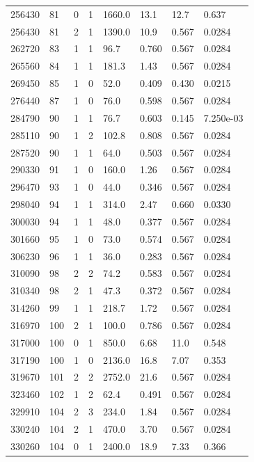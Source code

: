\documentclass[preview]{standalone}
\begin{document}
{{{\begin{tabular}{L{1.2cm}C{1.2cm} C{0.3cm}C{0.5cm} C{1.4cm}C{1.4cm} C{1.4cm}C{1.4cm}}
  256430  &    81  & 0     &  1 &  1660.0  & 13.1  & 12.7 &  0.637   \\ 
  256430  &    81  & 2     &  1 &  1390.0  & 10.9  & 0.567 &  0.0284   \\ 
  262720  &    83  & 1     &  1 &  96.7  & 0.760  & 0.567 &  0.0284   \\ 
  265560  &    84  & 1     &  1 &  181.3  & 1.43  & 0.567 &  0.0284   \\ 
  269450  &    85  & 1     &  0 &  52.0  & 0.409  & 0.430 &  0.0215   \\ 
  276440  &    87  & 1     &  0 &  76.0  & 0.598  & 0.567 &  0.0284   \\ 
  284790  &    90  & 1     &  1 &  76.7  & 0.603  & 0.145 &  7.250e-03   \\ 
  285110  &    90  & 1     &  2 &  102.8  & 0.808  & 0.567 &  0.0284   \\ 
  287520  &    90  & 1     &  1 &  64.0  & 0.503  & 0.567 &  0.0284   \\ 
  290330  &    91  & 1     &  0 &  160.0  & 1.26  & 0.567 &  0.0284   \\ 
  296470  &    93  & 1     &  0 &  44.0  & 0.346  & 0.567 &  0.0284   \\ 
  298040  &    94  & 1     &  1 &  314.0  & 2.47  & 0.660 &  0.0330   \\ 
  300030  &    94  & 1     &  1 &  48.0  & 0.377  & 0.567 &  0.0284   \\ 
  301660  &    95  & 1     &  0 &  73.0  & 0.574  & 0.567 &  0.0284   \\ 
  306230  &    96  & 1     &  1 &  36.0  & 0.283  & 0.567 &  0.0284   \\ 
  310090  &    98  & 2     &  2 &  74.2  & 0.583  & 0.567 &  0.0284   \\ 
  310340  &    98  & 2     &  1 &  47.3  & 0.372  & 0.567 &  0.0284   \\ 
  314260  &    99  & 1     &  1 &  218.7  & 1.72  & 0.567 &  0.0284   \\ 
  316970  &   100  & 2     &  1 &  100.0  & 0.786  & 0.567 &  0.0284   \\ 
  317000  &   100  & 0     &  1 &  850.0  & 6.68  & 11.0 &  0.548   \\ 
  317190  &   100  & 1     &  0 &  2136.0  & 16.8  & 7.07 &  0.353   \\ 
  319670  &   101  & 2     &  2 &  2752.0  & 21.6  & 0.567 &  0.0284   \\ 
  323460  &   102  & 1     &  2 &  62.4  & 0.491  & 0.567 &  0.0284   \\ 
  329910  &   104  & 2     &  3 &  234.0  & 1.84  & 0.567 &  0.0284   \\ 
  330240  &   104  & 2     &  1 &  470.0  & 3.70  & 0.567 &  0.0284   \\ 
  330260  &   104  & 0     &  1 &  2400.0  & 18.9  & 7.33 &  0.366   \\ 
\hline 
\end{tabular} 

}}}
\end{document}
